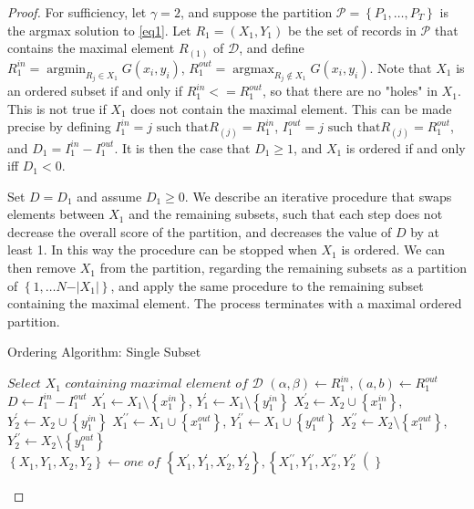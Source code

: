 \documentclass{article}
\theoremstyle{case}
\DeclareMathOperator*{\argmax}{argmax} %
\DeclareMathOperator*{\argmin}{argmin} %
\begin{document}
\begin{proof}
For sufficiency, let $\gamma = 2$, and suppose the partition $\mathcal{P} = \left\lbrace P_1, \dots, P_T\right\rbrace$ is the argmax solution to \ref{eq1}. Let $R_1 = (X_1, Y_1)$ be the set of records in $\mathcal{P}$ that contains the maximal element $R_{(1)}$ of $\mathcal{D}$, and define $R_1^{in} = \argmin_{R_j \in X_1} G(x_i, y_i)$, $R_1^{out} = \argmax_{R_j \not\in X_1} G(x_i, y_i)$. Note that $X_1$ is an ordered subset if and only if $R_1^{in} <= R_1^{out}$, so that there are no "holes" in $X_1$. This is not true if $X_1$ does not contain the maximal element. This can be made precise by defining $I_1^{in} = j \text{ such that} R_{(j)} = R_1^{in}$, $I_1^{out} = j \text{ such that} R_{(j)} = R_1^{out}$, and $D_1 = I_1^{in} - I_1^{out}$. It is then the case that $D_1 \geq 1$, and $X_1$ is ordered if and only iff $D_1 < 0$.

Set $D = D_1$ and assume $D_1 \geq 0$. We describe an iterative procedure that swaps elements between $X_1$ and the remaining subsets, such that each step does not decrease the overall score of the partition, and decreases the value of $D$ by at least 1. In this way the procedure can be stopped when $X_1$ is ordered. We can then remove $X_1$ from the partition, regarding the remaining subsets as a partition of $\left\lbrace 1, \dots N-\vert X_1 \vert\right\rbrace$, and apply the same procedure to the remaining subset containing the maximal element. The process terminates with a maximal ordered partition.

\begin{algorithm}
\caption{Ordering Algorithm: Single Subset}
\begin{algorithmic}[1]
\State $\textit{Select } X_1 \textit{ containing maximal element of } \mathcal{D}$
\State $\left( \alpha , \beta \right) \gets R_1^{in}, \left( a,b \right) \gets R_1^{out}$
\State $D \gets I_1^{in} - I_1^{out}$
\State $X_1^\prime \gets X_1\setminus \left\lbrace x_1^{in}\right\rbrace$, $Y_1^{\prime} \gets X_1\setminus \left\lbrace y_1^{in}\right\rbrace$
\State $X_2^{\prime} \gets X_2\cup \left\lbrace x_1^{in}\right\rbrace$, $Y_2^{\prime} \gets X_2\cup \left\lbrace y_1^{in}\right\rbrace$
\EndIf
{}
\State $X_1^{\prime\prime} \gets X_1\cup \left\lbrace x_1^{out}\right\rbrace$, $Y_1^{\prime\prime} \gets X_1\cup \left\lbrace y_1^{out}\right\rbrace$
\State $X_2^{\prime\prime} \gets X_2\setminus \left\lbrace x_1^{out}\right\rbrace$, $Y_2^{\prime\prime} \gets X_2\setminus \left\lbrace y_1^{out}\right\rbrace$
\EndIf
{}
\State $\left\lbrace X_1, Y_1, X_2, Y_2 \right\rbrace \gets \textit{one of } \left\lbrace X_1^{\prime}, Y_1^{\prime}, X_2^{\prime}, Y_2^{\prime}\right\rbrace, \left\lbrace X_1^{\prime\prime}, Y_1^{\prime\prime}, X_2^{\prime\prime}, Y_2^{\prime\prime}\right(\rbrace$
\EndIf
{}
\EndWhile
\end{algorithmic}
\end{algorithm}


\end{proof}
\end{document}
